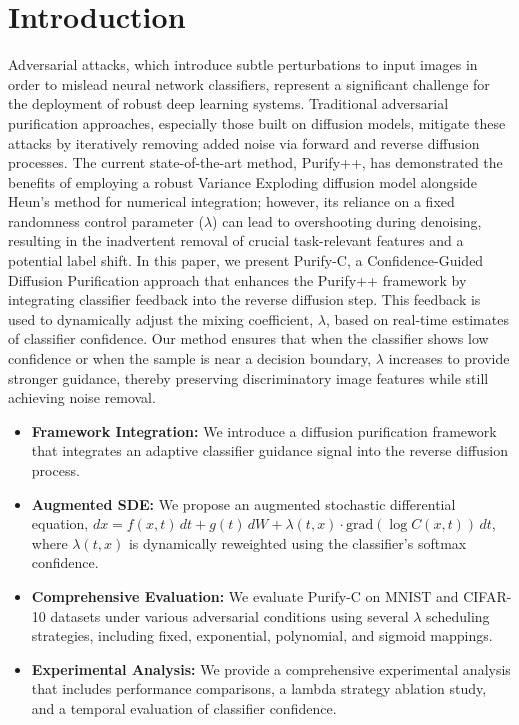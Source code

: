 \documentclass{article} %
\begin{document}
\section{Introduction}
\label{sec:intro}
Adversarial attacks, which introduce subtle perturbations to input images in order to mislead neural network classifiers, represent a significant challenge for the deployment of robust deep learning systems. Traditional adversarial purification approaches, especially those built on diffusion models, mitigate these attacks by iteratively removing added noise via forward and reverse diffusion processes. The current state-of-the-art method, Purify++, has demonstrated the benefits of employing a robust Variance Exploding diffusion model alongside Heun's method for numerical integration; however, its reliance on a fixed randomness control parameter ($\lambda$) can lead to overshooting during denoising, resulting in the inadvertent removal of crucial task-relevant features and a potential label shift. In this paper, we present Purify-C, a Confidence-Guided Diffusion Purification approach that enhances the Purify++ framework by integrating classifier feedback into the reverse diffusion step. This feedback is used to dynamically adjust the mixing coefficient, $\lambda$, based on real-time estimates of classifier confidence. Our method ensures that when the classifier shows low confidence or when the sample is near a decision boundary, $\lambda$ increases to provide stronger guidance, thereby preserving discriminatory image features while still achieving noise removal.

\begin{itemize}
  \item \textbf{Framework Integration:} We introduce a diffusion purification framework that integrates an adaptive classifier guidance signal into the reverse diffusion process.
  \item \textbf{Augmented SDE:} We propose an augmented stochastic differential equation, $dx = f(x,t)\,dt + g(t)\,dW + \lambda(t,x) \cdot \text{grad}(\log C(x,t))\,dt$, where $\lambda(t,x)$ is dynamically reweighted using the classifier's softmax confidence.
  \item \textbf{Comprehensive Evaluation:} We evaluate Purify-C on MNIST and CIFAR-10 datasets under various adversarial conditions using several $\lambda$ scheduling strategies, including fixed, exponential, polynomial, and sigmoid mappings.
  \item \textbf{Experimental Analysis:} We provide a comprehensive experimental analysis that includes performance comparisons, a lambda strategy ablation study, and a temporal evaluation of classifier confidence.
\end{itemize}
\end{document}
